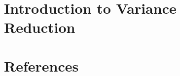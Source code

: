 



\tableofcontents

\clearpage
{}
\printglossary

\clearpage
{}
\section{Introduction to Variance Reduction}

\clearpage
{}
\section*{References}
\printbibliography[heading=none]

